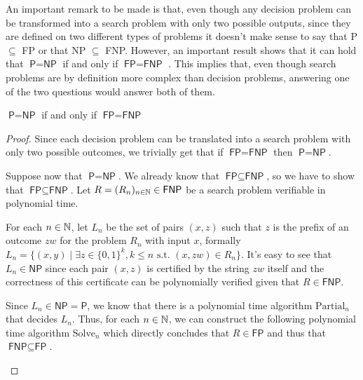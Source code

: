 An important remark to be made is that, even though any decision problem can be transformed into a search problem with only two possible outputs, since they are defined on two different types of problems it doesn't make sense to say that \textsf{P} $\subseteq$ \textsf{FP} or that \textsf{NP} $\subseteq$ \textsf{FNP}. However, an important result shows that it can hold that $\textsf{P} = \textsf{NP} $ if and only if $\textsf{FP} = \textsf{FNP}$ \cite{decision_vs_search, fp_vs_p}. This implies that, even though search problems are by definition more complex than decision problems, answering one of the two questions would answer both of them.

\begin{theorem}
    $\textsf{P} = \textsf{NP}$ if and only if $\textsf{FP} = \textsf{FNP}$
\end{theorem}

\begin{proof}
 Since each decision problem can be translated into a search problem with only two possible outcomes, we trivially get that if $\textsf{FP} = \textsf{FNP}$ then $\textsf{P} = \textsf{NP}$.
    
 Suppose now that $\textsf{P} = \textsf{NP}$. We already know that $\textsf{FP} \subseteq \textsf{FNP}$, so we have to show that $\textsf{FP} \subseteq \textsf{FNP}$. Let $R = (R_n)_{n \in \mathbb{N}} \in \textsf{FNP}$ be a search problem verifiable in polynomial time.
    
 For each $n \in \mathbb{N}$, let $L_n$ be the set of pairs $(x,z)$ such that $z$ is the prefix of an outcome $zw$ for the problem $R_n$ with input $x$, formally $L_n = \{(x,y) \mid \exists z \in \{0,1\}^{k}, k \leq n \text{ s.t. } (x,zw) \in R_n\}$. It's easy to see that $L_n \in \textsf{NP}$ since each pair $(x,z)$ is certified by the string $zw$ itself and the correctness of this certificate can be polynomially verified given that $R \in \textsf{FNP}$.
    
 Since $L_n \in \textsf{NP} = \textsf{P}$, we know that there is a polynomial time algorithm $\mathrm{Partial}_n$ that decides $L_n$. Thus, for each $n \in \mathbb{N}$, we can construct the following polynomial time algorithm $\mathrm{Solve}_n$ which directly concludes that $R \in \textsf{FP}$ and thus that $\textsf{FNP} \subseteq \textsf{FP}$.

    \begin{algorithmic}
                \Else
                \EndIf
            \EndWhile
        \EndFunction
    \end{algorithmic}
\end{proof}

